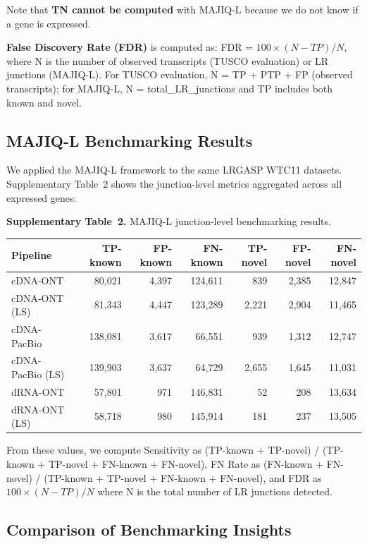 \documentclass[11pt]{article}
\begin{document}
\begin{responseboxnew}
Note that \textbf{TN cannot be computed} with MAJIQ-L because we do not know if a gene is expressed.

\textbf{False Discovery Rate (FDR)} is computed as: FDR = $100 \times (N - TP) / N$, where N is the number of observed transcripts (TUSCO evaluation) or LR junctions (MAJIQ-L). For TUSCO evaluation, N = TP + PTP + FP (observed transcripts); for MAJIQ-L, N = total\_LR\_junctions and TP includes both known and novel.

\subsection*{MAJIQ-L Benchmarking Results}

We applied the MAJIQ-L framework to the same LRGASP WTC11 datasets. Supplementary Table~2 shows the junction-level metrics aggregated across all expressed genes:

\begin{center}
\small
\textbf{Supplementary Table~2.} MAJIQ-L junction-level benchmarking results.

\vspace{0.2cm}
\begin{tabular}{lrrrrrr}
\toprule
\textbf{Pipeline} & \textbf{TP-known} & \textbf{FP-known} & \textbf{FN-known} & \textbf{TP-novel} & \textbf{FP-novel} & \textbf{FN-novel} \\
\midrule
cDNA-ONT & 80,021 & 4,397 & 124,611 & 839 & 2,385 & 12,847 \\
cDNA-ONT (LS) & 81,343 & 4,447 & 123,289 & 2,221 & 2,904 & 11,465 \\
cDNA-PacBio & 138,081 & 3,617 & 66,551 & 939 & 1,312 & 12,747 \\
cDNA-PacBio (LS) & 139,903 & 3,637 & 64,729 & 2,655 & 1,645 & 11,031 \\
dRNA-ONT & 57,801 & 971 & 146,831 & 52 & 208 & 13,634 \\
dRNA-ONT (LS) & 58,718 & 980 & 145,914 & 181 & 237 & 13,505 \\
\bottomrule
\end{tabular}
\end{center}

From these values, we compute Sensitivity as (TP-known + TP-novel) / (TP-known + TP-novel + FN-known + FN-novel), FN Rate as (FN-known + FN-novel) / (TP-known + TP-novel + FN-known + FN-novel), and FDR as $100 \times (N - TP) / N$ where N is the total number of LR junctions detected.

\subsection*{Comparison of Benchmarking Insights}


\end{responseboxnew}
\end{document}
